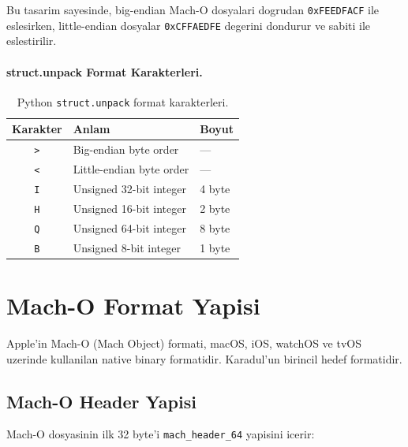 Bu tasarim sayesinde, big-endian Mach-O dosyalari dogrudan \texttt{0xFEEDFACF} ile eslesirken, little-endian dosyalar \texttt{0xCFFAEDFE} degerini dondurur ve  sabiti ile eslestirilir.

\paragraph{struct.unpack Format Karakterleri.}

\begin{table}[htbp]
\centering
\begin{tabular}{cll}
\toprule
\textbf{\color{sectioncyan}Karakter} & \textbf{\color{sectioncyan}Anlam} & \textbf{\color{sectioncyan}Boyut} \\
\midrule
\texttt{>} & Big-endian byte order & --- \\
\texttt{<} & Little-endian byte order & --- \\
\texttt{I} & Unsigned 32-bit integer & 4 byte \\
\texttt{H} & Unsigned 16-bit integer & 2 byte \\
\texttt{Q} & Unsigned 64-bit integer & 8 byte \\
\texttt{B} & Unsigned 8-bit integer & 1 byte \\
\bottomrule
\end{tabular}
\caption{Python \texttt{struct.unpack} format karakterleri.}
\label{tab:struct-format}
\end{table}


\section{Mach-O Format Yapisi}
\label{sec:macho-format}

Apple'in Mach-O (Mach Object) formati, macOS, iOS, watchOS ve tvOS uzerinde kullanilan native binary formatidir. Karadul'un birincil hedef formatidir.

\subsection{Mach-O Header Yapisi}

Mach-O dosyasinin ilk 32 byte'i \texttt{mach\_header\_64} yapisini icerir:

